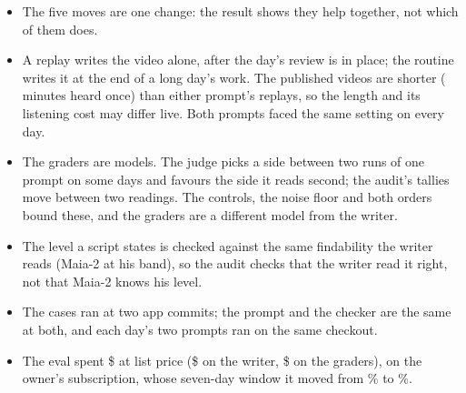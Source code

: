 \documentclass[11pt]{article}
\begin{document}
\begin{itemize}[nosep]
\item The five moves are one change: the result shows they help together, not which of them does.
\item A replay writes the video alone, after the day's review is in place; the routine writes it at
the end of a long day's work. The published videos are shorter (\PubHeard{} minutes heard once) than
either prompt's replays, so the length and its listening cost may differ live. Both prompts faced the
same setting on every day.
\item The graders are models. The judge picks a side between two runs of one prompt on some days and
favours the side it reads second; the audit's tallies move between two readings. The controls, the
noise floor and both orders bound these, and the graders are a different model from the writer.
\item The level a script states is checked against the same findability the writer reads (Maia-2 at
his band), so the audit checks that the writer read it right, not that Maia-2 knows his level.
\item The cases ran at two app commits; the prompt and the checker are the same at both, and each
day's two prompts ran on the same checkout.
\item The eval spent \$\Spent{} at list price (\$\WriterSpend{} on the writer, \$\GraderSpend{} on
the graders), on the owner's subscription, whose seven-day window it moved from \SevenDayFirst\% to
\SevenDayLast\%.
\end{itemize}
\end{document}
